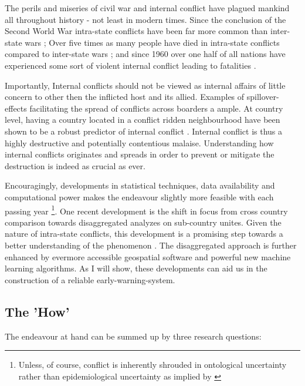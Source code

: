 \documentclass[a4paper]{article}
\begin{document}
The perils and miseries of civil war and internal conflict have plagued mankind all throughout history - not least in modern times. Since the conclusion of the Second World War intra-state conflicts have been far more common than inter-state wars \citep[563]{Collier_Hoeffler_2004}; Over five times as many people have died in intra-state conflicts compared to inter-state wars \citep[563]{Collier_Hoeffler_2004}; and since 1960 over one half of all nations have experienced some sort of violent internal conflict leading to fatalities \citep[3-4]{Blattman_Miguel_2010}.\par

Importantly, Internal conflicts should not be viewed as internal affairs of little concern to other then the inflicted host and its allied. Examples of spillover-effects facilitating the spread of conflicts across boarders a ample. At country level, having a country located in a conflict ridden neighbourhood have been shown to be a robust predictor of internal conflict \citep{Hegre_Sambanis_2006,Goldstone_2010}. Internal conflict is thus a highly destructive and potentially contentious malaise. Understanding how internal conflicts originates and spreads in order to prevent or mitigate the destruction is indeed as crucial as ever.\par

Encouragingly, developments in statistical techniques, data availability and computational power makes the endeavour slightly more feasible with each passing year \footnote{Unless, of course, conflict is inherently shrouded in ontological uncertainty rather than epidemiological uncertainty as implied by \cite{Gartzke_1999}}. One recent development is the shift in focus from cross country comparison towards disaggregated analyzes on sub-country unites. Given the nature of intra-state conflicts, this development is a promising step towards a better understanding of the phenomenon \citep{Cederman_Gleditsch_2009}. The disaggregated approach is further enhanced by evermore accessible geospatial software and powerful new machine learning algorithms. As I will show, these developments can aid us in the construction of a reliable early-warning-system.\par

\subsection{The 'How'}

The endeavour at hand can be summed up by three research questions:\par
\end{document}
